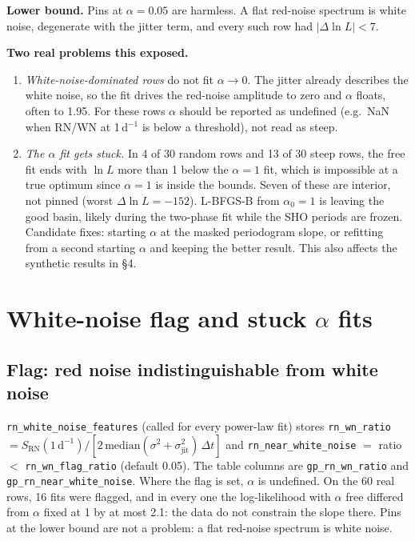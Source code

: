 \documentclass[11pt]{article}
\newcommand{\code}[1]{\texttt{#1}}
\begin{document}
\textbf{Lower bound.} Pins at $\alpha = 0.05$ are harmless. A flat red-noise spectrum is
white noise, degenerate with the jitter term, and every such row had
$|\Delta\ln L| < 7$.

\textbf{Two real problems this exposed.}
\begin{enumerate}
\item \emph{White-noise-dominated rows} do not fit $\alpha \to 0$. The jitter already
  describes the white noise, so the fit drives the red-noise amplitude to zero and
  $\alpha$ floats, often to 1.95. For these rows $\alpha$ should be reported as undefined
  (e.g.\ NaN when RN/WN at 1\,d$^{-1}$ is below a threshold), not read as steep.
\item \emph{The $\alpha$ fit gets stuck.} In 4 of 30 random rows and 13 of 30 steep rows,
  the free fit ends with $\ln L$ more than 1 below the $\alpha=1$ fit, which is impossible
  at a true optimum since $\alpha=1$ is inside the bounds. Seven of these are interior, not
  pinned (worst $\Delta\ln L = -152$). L-BFGS-B from $\alpha_0=1$ is leaving the good basin,
  likely during the two-phase fit while the SHO periods are frozen. Candidate fixes:
  starting $\alpha$ at the masked periodogram slope, or refitting from a second starting
  $\alpha$ and keeping the better result. This also affects the synthetic results in
  \S4.
\end{enumerate}

\section{White-noise flag and stuck $\alpha$ fits}

\subsection{Flag: red noise indistinguishable from white noise}

\code{rn\_white\_noise\_features} (called for every power-law fit) stores
\code{rn\_wn\_ratio} $= S_\mathrm{RN}(1\,\mathrm{d}^{-1}) / [2\,\mathrm{median}(\sigma^2 +
\sigma_\mathrm{jit}^2)\,\Delta t]$ and \code{rn\_near\_white\_noise} $=$ ratio $<$
\code{rn\_wn\_flag\_ratio} (default 0.05). The table columns are \code{gp\_rn\_wn\_ratio} and
\code{gp\_rn\_near\_white\_noise}. Where the flag is set, $\alpha$ is undefined. On the 60
real rows, 16 fits were flagged, and in every one the log-likelihood with $\alpha$ free
differed from $\alpha$ fixed at 1 by at most 2.1: the data do not constrain the slope there.
Pins at the lower bound are not a problem: a flat red-noise spectrum is white noise.
\end{document}
